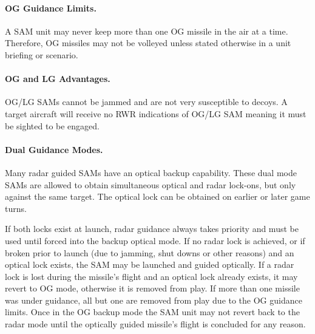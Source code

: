 \paragraph{OG Guidance Limits.} A SAM unit may never keep more than one OG missile in the air at a time. Therefore, OG missiles may not be volleyed unless stated otherwise in a unit briefing or scenario.

\paragraph{OG and LG Advantages.} OG/LG SAMs cannot be jammed and are not very susceptible to decoys. A target aircraft will receive no RWR indications of OG/LG SAM meaning it must be sighted to be engaged.


\paragraph{Dual Guidance Modes.} Many radar guided SAMs have an optical backup capability. These dual mode SAMs are allowed to obtain simultaneous optical and radar lock-ons, but only against the same target. The optical lock can be obtained on earlier or later game turns.

If both locks exist at launch, radar guidance always takes priority and must be used until forced into the backup optical mode. If no radar lock is achieved, or if broken prior to launch (due to jamming, shut downs or other reasons) and an optical lock exists, the SAM may be launched and guided optically. If a radar lock is lost during the missile's flight and an optical lock already exists, it may revert to OG mode, otherwise it is removed from play. If more than one missile was under guidance, all but one are removed from play due to the OG guidance limits. Once in the OG backup mode the SAM unit may not revert back to the radar mode until the optically guided missile's flight is concluded for any reason.